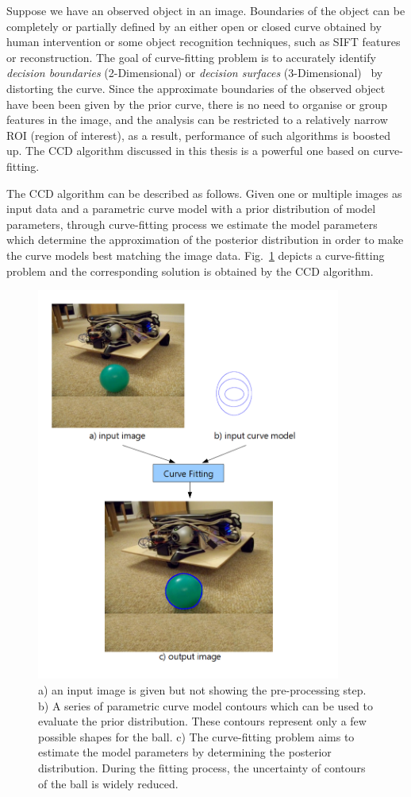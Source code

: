 Suppose we have an observed object in an
image. Boundaries of the object can be completely or partially defined
by an either open or closed curve obtained by human intervention or
some object recognition techniques, such as SIFT features or reconstruction. The goal of
curve-fitting problem is to accurately identify \textit{decision boundaries} (2-Dimensional) or
\textit{decision surfaces} (3-Dimensional)~\cite{bishop2006pattern} by
distorting the curve. Since the approximate boundaries of the observed
object have been been given by the prior curve, there is no need to organise or group features in the
image, and the analysis can be restricted to a relatively narrow
ROI (region of interest), as a result, performance of such algorithms
is boosted up. The CCD algorithm discussed in this thesis is a
powerful one based on curve-fitting.

The CCD algorithm can be described as follows. Given one or multiple images as input
data and a parametric curve model with a prior distribution of model
parameters, through curve-fitting process we estimate the model
parameters which determine the approximation of the posterior
distribution in order to make the curve models best matching the image data.
Fig.~\ref{fig:fitting} depicts a curve-fitting problem and the corresponding solution is obtained by the
CCD algorithm.
\begin{figure}[htb]
  \centering
  \includegraphics[width=10cm]{images/fitting.png}
  \caption[The description of curve-fitting problem]{a) an input
    image is given but not showing the pre-processing step. b) A series of
    parametric curve model contours which can be used to evaluate the
    prior distribution. These contours represent only a few possible
    shapes for the ball. c) The curve-fitting problem aims to estimate the model
    parameters by determining the posterior distribution. During the
    fitting process, the uncertainty of contours of the ball is widely
    reduced.}
  \label{fig:fitting}
\end{figure}



